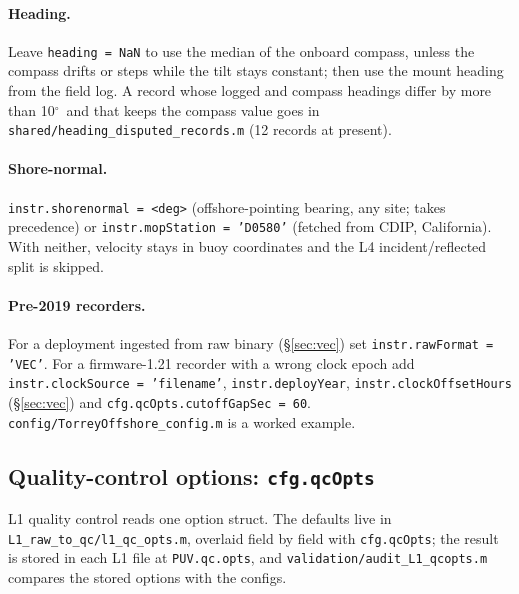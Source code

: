 \documentclass[11pt]{article}
\newcommand{\code}[1]{\texttt{#1}}
\providecommand{\degree}{\ensuremath{^{\circ}}}
\begin{document}
\paragraph{Heading.} Leave \code{heading = NaN} to use the median of the onboard compass,
unless the compass drifts or steps while the tilt stays constant; then use the mount heading
from the field log. A record whose logged and compass headings differ by more than
10\degree\ and that keeps the compass value goes in
\code{shared/heading\_disputed\_records.m} (12 records at present).

\paragraph{Shore-normal.} \code{instr.shorenormal = <deg>} (offshore-pointing bearing, any site;
takes precedence) or \code{instr.mopStation = 'D0580'} (fetched from CDIP, California). With
neither, velocity stays in buoy coordinates and the L4 incident/reflected split is skipped.

\paragraph{Pre-2019 recorders.} For a deployment ingested from raw binary (\S\ref{sec:vec}) set
\code{instr.rawFormat = 'VEC'}. For a firmware-1.21 recorder with a wrong clock epoch add
\code{instr.clockSource = 'filename'}, \code{instr.deployYear}, \code{instr.clockOffsetHours}
(\S\ref{sec:vec}) and \code{cfg.qcOpts.cutoffGapSec = 60}. \code{config/TorreyOffshore\_config.m}
is a worked example.

\subsection{Quality-control options: \texttt{cfg.qcOpts}}
\label{sec:qcopts}

L1 quality control reads one option struct. The defaults live in
\code{L1\_raw\_to\_qc/l1\_qc\_opts.m}, overlaid field by field with \code{cfg.qcOpts}; the
result is stored in each L1 file at \code{PUV.qc.opts}, and
\code{validation/audit\_L1\_qcopts.m} compares the stored options with the configs.
\end{document}
